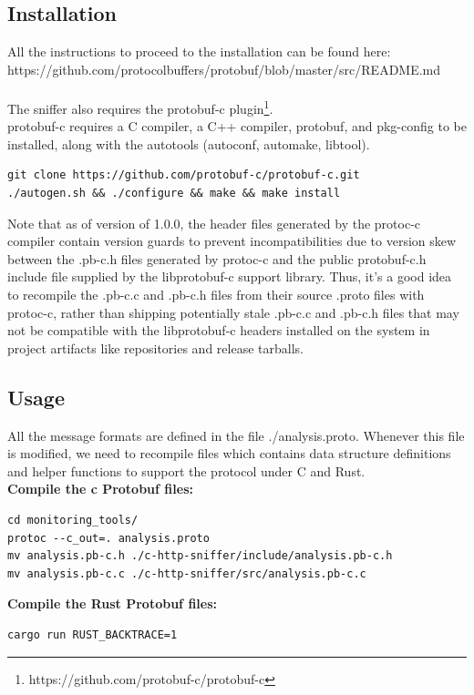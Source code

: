 \documentclass[12pt,hidelinks]{article}
\begin{document}
\subsection{Installation}
All the instructions to proceed to the installation can be found here: \\
https://github.com/protocolbuffers/protobuf/blob/master/src/README.md \\
\\
The sniffer also requires the protobuf-c plugin\footnote{https://github.com/protobuf-c/protobuf-c}. \\
protobuf-c requires a C compiler, a C++ compiler, protobuf, and pkg-config to be installed, along with the autotools (autoconf, automake, libtool).
\begin{verbatim}
git clone https://github.com/protobuf-c/protobuf-c.git
./autogen.sh && ./configure && make && make install
\end{verbatim}

Note that as of version of 1.0.0, the header files generated by the protoc-c compiler contain version guards to prevent incompatibilities due to version skew between the .pb-c.h files generated by protoc-c and the public protobuf-c.h include file supplied by the libprotobuf-c support library. 
Thus, it's a good idea to recompile the .pb-c.c and .pb-c.h files from their source .proto files with protoc-c, rather than shipping potentially stale .pb-c.c and .pb-c.h files that may not be compatible with the libprotobuf-c headers installed on the system in project artifacts like repositories and release tarballs. 

\subsection{Usage}
All the message formats are defined in the file ./analysis.proto. Whenever this file is modified, we need to recompile files which contains data structure definitions and helper functions to support the protocol under C and Rust. \\

\textbf{Compile the c Protobuf files:}
\begin{verbatim}
cd monitoring_tools/
protoc --c_out=. analysis.proto
mv analysis.pb-c.h ./c-http-sniffer/include/analysis.pb-c.h
mv analysis.pb-c.c ./c-http-sniffer/src/analysis.pb-c.c
\end{verbatim}


\textbf{Compile the Rust Protobuf files:}
\begin{verbatim}
cargo run RUST_BACKTRACE=1 
\end{verbatim}
\end{document}
